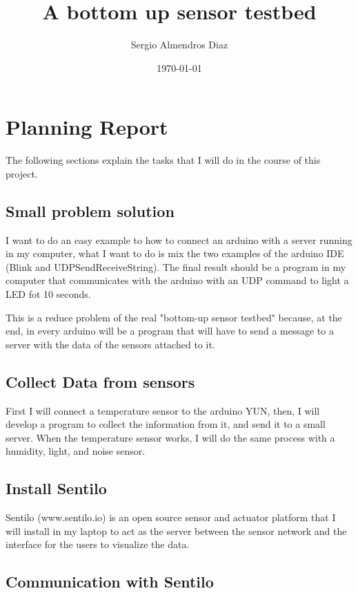 \documentclass[10pt,a4paper]{article}
\title{A bottom up sensor testbed}
\author{Sergio Almendros Diaz}
\date{\today}
\begin{document}
\maketitle

\section{Planning Report}

The following sections explain the tasks that I will do in the course of this project.

\subsection{Small problem solution}

I want to do an easy example to how to connect an arduino with a server running in my computer, what I want to do is mix the two examples of the arduino IDE (Blink and UDPSendReceiveString). The final result should be a program in my computer that communicates with the arduino with an UDP command to light a LED fot 10 seconds.

This is a reduce problem of the real "bottom-up sensor testbed" because, at the end, in every arduino will be a program that will have to send a message to a server with the data of the sensors attached to it.

\subsection{Collect Data from sensors}

First I will connect a temperature sensor to the arduino YUN, then, I will develop a program to collect the information from it, and send it to a small server.
When the temperature sensor works, I will do the same process with a humidity, light, and noise sensor.

\subsection{Install Sentilo}

Sentilo (www.sentilo.io) is an open source sensor and actuator platform that I will install in my laptop to act as the server between the sensor network and the interface for the users to visualize the data. 

\subsection{Communication with Sentilo}
\end{document}
